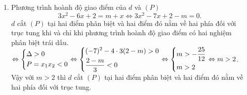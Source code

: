 \begin{bt}
{\begin{enumerate}
			\item Phương trình hoành độ giao điểm của $d$ và $(P)$
			$$3x^{2}-6x+2=m+x \Leftrightarrow 3x^{2}-7x+2-m=0.$$
			$d$ cắt $(P)$ tại hai điểm phân biệt và hai điểm đó nằm về hai phía đối với trục tung khi và chỉ khi phương trình hoành độ giao điểm có hai nghiệm phân biệt trái dấu.\\
			$\Leftrightarrow \left\{\begin{aligned}& \Delta >0\\ &P=x_{1}x_{2}<0\end{aligned}\right. \Leftrightarrow \left\{\begin{aligned}& (-7)^{2}-4 \cdot 3(2-m)>0\\ & \dfrac{2-m}{3} <0\end{aligned}\right. \Leftrightarrow \left\{\begin{aligned}& m>- \dfrac{25}{12}\\ & m>2\end{aligned}\right. \Leftrightarrow m>2$.\\
			Vậy với $m>2$ thì $d$ cắt $(P)$ tại hai điểm phân biệt và hai điểm đó nằm về hai phía đối với trục tung.
		\end{enumerate}		
	}
\end{bt}

